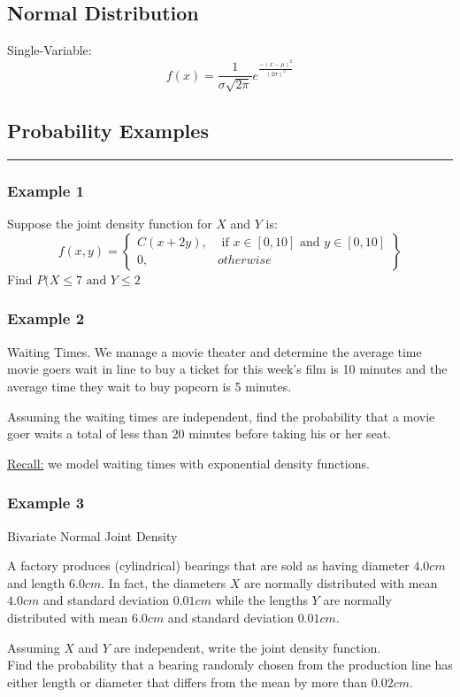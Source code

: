 \documentclass[12pt]{article}
\begin{document}
\subsection{Normal Distribution}
Single-Variable:
\[
	f(x) = \frac{1}{\sigma\sqrt{2\pi}}e^{\frac{-(x-\mu)^2}{(2\sigma)^2}}
\]
\subsection{Probability Examples}
\rule{\textwidth}{0.1mm}

\subsubsection{Example 1}
Suppose the joint density function for \(X\) and \(Y\) is:
\[
	f(x,y) = \begin{Bmatrix}
		C(x + 2y), & \text{ if } x \in [0,10] \text{ and } y \in [0,10] \\
		0, & otherwise
	\end{Bmatrix}
\]
Find \(P( X \leq 7 \text{ and } Y \leq 2\)

\subsubsection{Example 2}

Waiting Times. We manage a movie theater and determine the average time movie goers wait in line to buy a ticket for this week's film is 10 minutes and the average time they wait to buy popcorn is 5 minutes.

Assuming the waiting times are independent, find the probability that a movie goer waits a total of less than 20 minutes before taking his or her seat.

\underline{Recall:} we model waiting times with exponential density functions.

\subsubsection{Example 3}
Bivariate Normal Joint Density

A factory produces (cylindrical) bearings that are sold as having diameter \(4.0cm\) and length \(6.0cm\). In fact, the diameters \(X\) are normally distributed with mean \(4.0cm\) and standard deviation \(0.01cm\) while the lengths \(Y\) are normally distributed with mean \(6.0cm\) and standard deviation \(0.01cm\). 

Assuming \(X\) and \(Y\) are independent, write the joint density function. \\
Find the probability that a bearing randomly chosen from the production line has either length or diameter that differs from the mean by more than \(0.02cm\).
\end{document}
